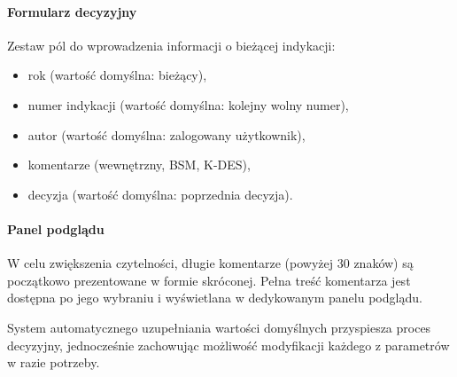 \paragraph{Formularz decyzyjny}
Zestaw pól do wprowadzenia informacji o bieżącej indykacji:
\begin{itemize}
    \item rok (wartość domyślna: bieżący),
    \item numer indykacji (wartość domyślna: kolejny wolny numer),
    \item autor (wartość domyślna: zalogowany użytkownik),
    \item komentarze (wewnętrzny, BSM, K-DES),
    \item decyzja (wartość domyślna: poprzednia decyzja).
\end{itemize}

\paragraph{Panel podglądu}
W celu zwiększenia czytelności, długie komentarze (powyżej 30 znaków) są początkowo prezentowane w formie skróconej. Pełna treść komentarza jest dostępna po jego wybraniu i wyświetlana w dedykowanym panelu podglądu.

System automatycznego uzupełniania wartości domyślnych przyspiesza proces decyzyjny, jednocześnie zachowując możliwość modyfikacji każdego z parametrów w razie potrzeby.
